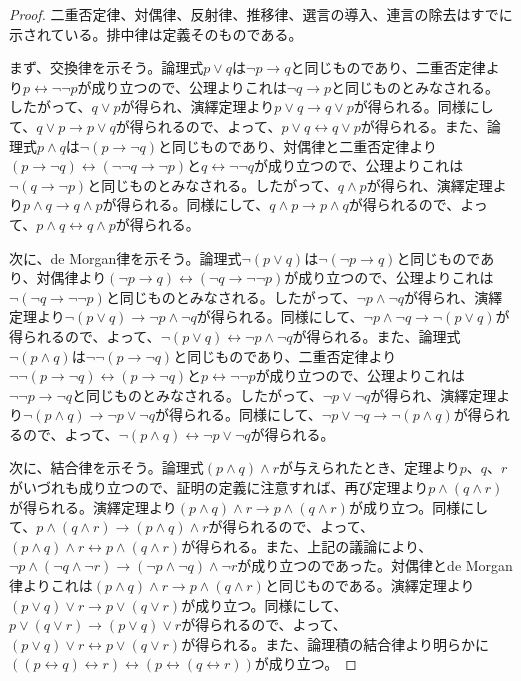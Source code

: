 \documentclass[a4paper]{jsarticle}
\begin{document}
\begin{proof}
二重否定律、対偶律、反射律、推移律、選言の導入、連言の除去はすでに示されている。排中律は定義そのものである。\par
まず、交換律を示そう。論理式$p \vee q$は$\neg p \rightarrow q$と同じものであり、二重否定律より$p \leftrightarrow \neg\neg p$が成り立つので、公理よりこれは$\neg q \rightarrow p$と同じものとみなされる。したがって、$q \vee p$が得られ、演繹定理より$p \vee q \rightarrow q \vee p$が得られる。同様にして、$q \vee p \rightarrow p \vee q$が得られるので、よって、$p \vee q \leftrightarrow q \vee p$が得られる。また、論理式$p \land q$は$\neg(p \rightarrow \neg q)$と同じものであり、対偶律と二重否定律より$(p \rightarrow \neg q) \leftrightarrow (\neg\neg q \rightarrow \neg p)$と$q \leftrightarrow \neg\neg q$が成り立つので、公理よりこれは$\neg(q \rightarrow \neg p)$と同じものとみなされる。したがって、$q \land p$が得られ、演繹定理より$p \land q \rightarrow q \land p$が得られる。同様にして、$q \land p \rightarrow p \land q$が得られるので、よって、$p \land q \leftrightarrow q \land p$が得られる。\par
次に、de Morgan律を示そう。論理式$\neg(p \vee q)$は$\neg(\neg p \rightarrow q)$と同じものであり、対偶律より$(\neg p \rightarrow q) \leftrightarrow (\neg q \rightarrow \neg\neg p)$が成り立つので、公理よりこれは$\neg(\neg q \rightarrow \neg\neg p)$と同じものとみなされる。したがって、$\neg p \land \neg q$が得られ、演繹定理より$\neg(p \vee q) \rightarrow \neg p \land \neg q$が得られる。同様にして、$\neg p \land \neg q \rightarrow \neg(p \vee q)$が得られるので、よって、$\neg(p \vee q) \leftrightarrow \neg p \land \neg q$が得られる。また、論理式$\neg(p \land q)$は$\neg\neg(p \rightarrow \neg q)$と同じものであり、二重否定律より$\neg\neg(p \rightarrow \neg q) \leftrightarrow (p \rightarrow \neg q)$と$p \leftrightarrow \neg\neg p$が成り立つので、公理よりこれは$\neg\neg p \rightarrow \neg q$と同じものとみなされる。したがって、$\neg p \vee \neg q$が得られ、演繹定理より$\neg(p \land q) \rightarrow \neg p \vee \neg q$が得られる。同様にして、$\neg p \vee \neg q \rightarrow \neg(p \land q)$が得られるので、よって、$\neg(p \land q) \leftrightarrow \neg p \vee \neg q$が得られる。\par
次に、結合律を示そう。論理式$(p \land q) \land r$が与えられたとき、定理より$p$、$q$、$r$がいづれも成り立つので、証明の定義に注意すれば、再び定理より$p \land (q \land r)$が得られる。演繹定理より$(p \land q) \land r \rightarrow p \land (q \land r)$が成り立つ。同様にして、$p \land (q \land r) \rightarrow (p \land q) \land r$が得られるので、よって、$(p \land q) \land r \leftrightarrow p \land (q \land r)$が得られる。また、上記の議論により、$\neg p \land (\neg q \land \neg r) \rightarrow (\neg p \land \neg q) \land \neg r$が成り立つのであった。対偶律とde Morgan律よりこれは$(p \land q) \land r \rightarrow p \land (q \land r)$と同じものである。演繹定理より$(p \vee q) \vee r \rightarrow p \vee (q \vee r)$が成り立つ。同様にして、$p \vee (q \vee r) \rightarrow (p \vee q) \vee r$が得られるので、よって、$(p \vee q) \vee r \leftrightarrow p \vee (q \vee r)$が得られる。また、論理積の結合律より明らかに$\left( (p \leftrightarrow q) \leftrightarrow r \right) \leftrightarrow \left( p \leftrightarrow (q \leftrightarrow r) \right)$が成り立つ。\par

\end{proof}
\end{document}
